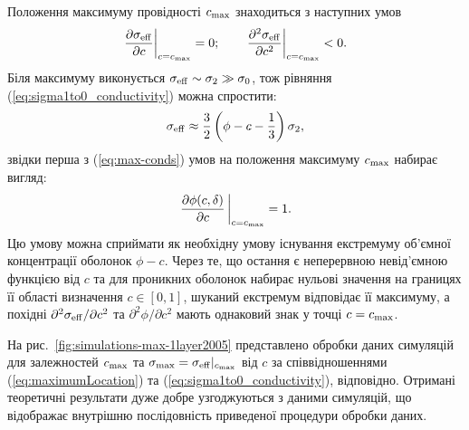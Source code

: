 \documentclass[14pt,twoside]{vakthesis}
\begin{document}
Положення максимуму провідності $c_{\rm max}$ знаходиться з наступних умов 
\begin{equation}\label{eq:max-conds}
	\left. \frac{\partial \sigma_{\rm eff}}{\partial c} \right|_{c = c_{\rm max}} = 0; \qquad
	\left. \frac{\partial^2 \sigma_{\rm eff}}{\partial c^2}\right|_{c = c_{\rm max}} < 0.
\end{equation}
Біля максимуму виконується $\sigma_{\rm eff} \sim \sigma_2 \gg \sigma_0$, тож рівняння (\ref{eq:sigma1to0_conductivity}) можна спростити:
\begin{equation}\label{eq:sigma1to0_conductivity-max}
 \sigma_{\rm eff} \approx \frac{3}{2} \left( \phi - c - \frac{1}{3} \right) \sigma_2,
\end{equation}
звідки перша з (\ref{eq:max-conds}) умов на положення максимуму $c_{\rm max}$ набирає вигляд:
\begin{equation}  \label{eq:maximumLocation}
\left. \frac{\partial \phi(c,\delta)}{\partial c}\,\right|_{c = c_{\rm
		{max}}} = 1.
\end{equation}
Цю умову можна сприймати як необхідну умову існування екстремуму об'єм\-ної концентрації оболонок $\phi - c$. Через те, що остання є неперервною невід'ємною функцією від $c$ та для проникних оболонок набирає нульові значення на границях її області визначення $c \in [0,1]$, шуканий екстремум відповідає її максимуму, а похідні $\partial^2\sigma_{\rm eff}/\partial c^2$ та $\partial^2\phi / \partial c^2$ мають однаковий знак у точці $c = c_{\rm max}$. 

На рис.~\ref{fig:simulations-max-1layer2005} представлено обробки даних симуляцій \cite{Siekierski2005} для залежностей $c_{\rm max}$ та $\sigma_{\rm max} = \sigma_{\rm eff}|_{c_{\rm max}}$ від $c$ за  співвідношеннями (\ref{eq:maximumLocation}) та (\ref{eq:sigma1to0_conductivity}), відповідно. Отримані теоретичні результати дуже добре узгоджуються з даними симуляцій, що відображає внутрішню послідовність приведеної процедури обробки даних.
\end{document}
